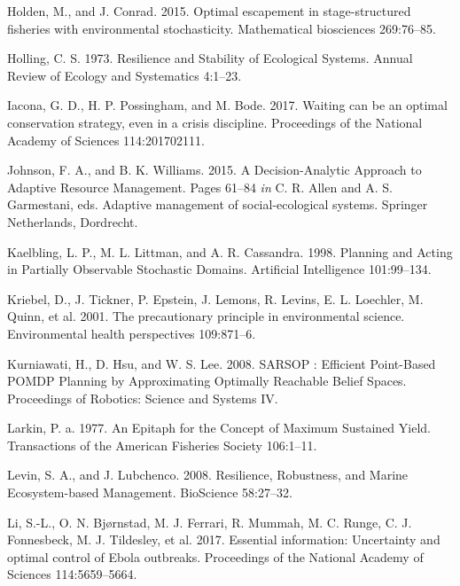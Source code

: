 \documentclass[3p]{elsarticle} %
\begin{document}
\leavevmode\hypertarget{ref-Holden2015}{}%
Holden, M., and J. Conrad. 2015. Optimal escapement in stage-structured
fisheries with environmental stochasticity. Mathematical biosciences
269:76--85.

\leavevmode\hypertarget{ref-Holling1973}{}%
Holling, C. S. 1973. Resilience and Stability of Ecological Systems.
Annual Review of Ecology and Systematics 4:1--23.

\leavevmode\hypertarget{ref-Iacona2017}{}%
Iacona, G. D., H. P. Possingham, and M. Bode. 2017. Waiting can be an
optimal conservation strategy, even in a crisis discipline. Proceedings
of the National Academy of Sciences 114:201702111.

\leavevmode\hypertarget{ref-Johnson2015}{}%
Johnson, F. A., and B. K. Williams. 2015. A Decision-Analytic Approach
to Adaptive Resource Management. Pages 61--84 \emph{in} C. R. Allen and
A. S. Garmestani, eds. Adaptive management of social-ecological systems.
Springer Netherlands, Dordrecht.

\leavevmode\hypertarget{ref-Kaelbling1998}{}%
Kaelbling, L. P., M. L. Littman, and A. R. Cassandra. 1998. Planning and
Acting in Partially Observable Stochastic Domains. Artificial
Intelligence 101:99--134.

\leavevmode\hypertarget{ref-Kriebel2001}{}%
Kriebel, D., J. Tickner, P. Epstein, J. Lemons, R. Levins, E. L.
Loechler, M. Quinn, et al. 2001. The precautionary principle in
environmental science. Environmental health perspectives 109:871--6.

\leavevmode\hypertarget{ref-Kurniawati2008}{}%
Kurniawati, H., D. Hsu, and W. S. Lee. 2008. SARSOP : Efficient
Point-Based POMDP Planning by Approximating Optimally Reachable Belief
Spaces. Proceedings of Robotics: Science and Systems IV.

\leavevmode\hypertarget{ref-Larkin1977}{}%
Larkin, P. a. 1977. An Epitaph for the Concept of Maximum Sustained
Yield. Transactions of the American Fisheries Society 106:1--11.

\leavevmode\hypertarget{ref-Levin2008}{}%
Levin, S. A., and J. Lubchenco. 2008. Resilience, Robustness, and Marine
Ecosystem-based Management. BioScience 58:27--32.

\leavevmode\hypertarget{ref-Li2017}{}%
Li, S.-L., O. N. Bjørnstad, M. J. Ferrari, R. Mummah, M. C. Runge, C. J.
Fonnesbeck, M. J. Tildesley, et al. 2017. Essential information:
Uncertainty and optimal control of Ebola outbreaks. Proceedings of the
National Academy of Sciences 114:5659--5664.
\end{document}
